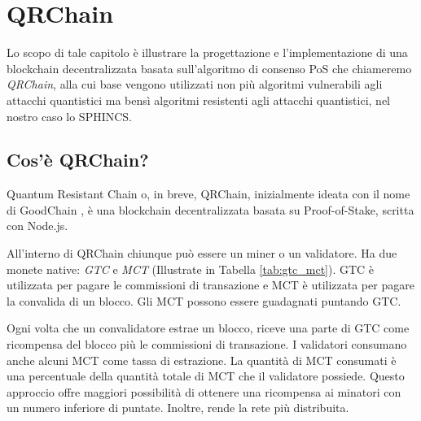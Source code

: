 \chapter{QRChain}
Lo scopo di tale capitolo è illustrare la progettazione e l'implementazione di una blockchain decentralizzata basata sull'algoritmo di consenso PoS che chiameremo \textit{QRChain}, alla cui base vengono utilizzati non più algoritmi vulnerabili agli attacchi quantistici ma bensì algoritmi resistenti agli attacchi quantistici, nel nostro caso lo SPHINCS.

\section{Cos'è QRChain?}
Quantum Resistant Chain o, in breve, QRChain, inizialmente ideata con il nome di GoodChain \cite{Ghorbanzadeh_GoodChain_2022}, è una blockchain decentralizzata basata su Proof-of-Stake, scritta con Node.js.

All'interno di QRChain chiunque può essere un miner o un validatore. Ha due monete native: \textit{GTC} e \textit{MCT} (Illustrate in Tabella \ref{tab:gtc_mct}). GTC è utilizzata per pagare le commissioni di transazione e MCT è utilizzata per pagare la convalida di un blocco. Gli MCT possono essere guadagnati puntando GTC.

\begin{table}[]
  \caption{GTC e MCT}
  \label{tab:gtc_mct}
\end{table}

Ogni volta che un convalidatore estrae un blocco, riceve una parte di GTC come ricompensa del blocco più le commissioni di transazione.
I validatori consumano anche alcuni MCT come tassa di estrazione. La quantità di MCT consumati è una percentuale della quantità totale di MCT che il validatore possiede.
Questo approccio offre maggiori possibilità di ottenere una ricompensa ai minatori con un numero inferiore di puntate. Inoltre, rende la rete più distribuita.

